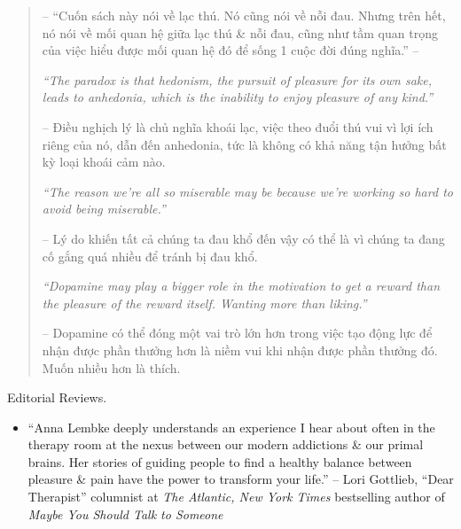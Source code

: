 \documentclass{article}
\begin{document}
\begin{enumerate}
\begin{quotation}
		-- ``Cuốn sách này nói về lạc thú. Nó cũng nói về nỗi đau. Nhưng trên hết, nó nói về mối quan hệ giữa lạc thú \& nỗi đau, cũng như tầm quan trọng của việc hiểu được mối quan hệ đó để sống 1 cuộc đời đúng nghĩa.'' -- \cite[p. 9]{Lembke_dopamine_VN}
		
		{\it``The paradox is that hedonism, the pursuit of pleasure for its own sake, leads to anhedonia, which is the inability to enjoy pleasure of any kind.''}
		
		-- Điều nghịch lý là chủ nghĩa khoái lạc, việc theo đuổi thú vui vì lợi ích riêng của nó, dẫn đến anhedonia, tức là không có khả năng tận hưởng bất kỳ loại khoái cảm nào.
		
		{\it``The reason we're all so miserable may be because we're working so hard to avoid being miserable.''}
		
		-- Lý do khiến tất cả chúng ta đau khổ đến vậy có thể là vì chúng ta đang cố gắng quá nhiều để tránh bị đau khổ.
		
		{\it``Dopamine may play a bigger role in the motivation to get a reward than the pleasure of the reward itself. Wanting more than liking.''}
		
		-- Dopamine có thể đóng một vai trò lớn hơn trong việc tạo động lực để nhận được phần thưởng hơn là niềm vui khi nhận được phần thưởng đó. Muốn nhiều hơn là thích.
	\end{quotation}
	{\sf Editorial Reviews.}
	\begin{itemize}
		\item ``{\sc Anna Lembke} deeply understands an experience I hear about often in the therapy room at the nexus between our modern addictions \& our primal brains. Her stories of guiding people to find a healthy balance between pleasure \& pain have the power to transform your life.'' -- {\sc Lori Gottlieb}, ``Dear Therapist'' columnist at {\it The Atlantic, New York Times} bestselling author of {\it Maybe You Should Talk to Someone}
		

\end{itemize}
\end{enumerate}
\end{document}
